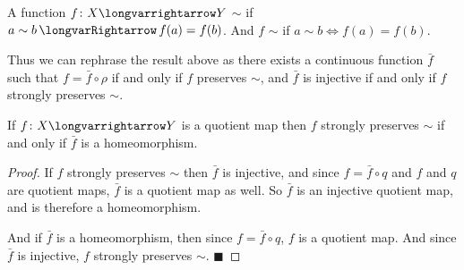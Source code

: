 \documentclass[10pt]{article}
\def\qed{\hskip1cm\penalty-100\hbox{}\hfill$\blacksquare$}
\def\longto{\longvarrightarrow}
\def\implies{\,\longvarRightarrow\,}
\begin{document}
\begin{defn*}

    A function $f\colon X\longto Y$  $\sim$ if $a\sim b\implies f(a)=f(b)$.
    And $f$  $\sim$ if $a\sim b\iff f(a)=f(b)$.

\end{defn*}

Thus we can rephrase the result above as there exists a continuous function $\bar f$ such that $f=\bar f\circ\rho$ if and only if $f$ preserves $\sim$, and $\bar f$ is injective if and only if $f$ strongly
preserves $\sim$.

\begin{prop*}

    If $f\colon X\longto Y$ is a quotient map then $f$ strongly preserves $\sim$ if and only if $\bar f$ is a homeomorphism.

\end{prop*}

\begin{proof}

    If $f$ strongly preserves $\sim$ then $\bar f$ is injective, and since $f=\bar f\circ q$ and $f$ and $q$ are quotient maps, $\bar f$ is a quotient map as well.
    So $\bar f$ is an injective quotient map, and is therefore a homeomorphism.

    And if $\bar f$ is a homeomorphism, then since $f=\bar f\circ q$, $f$ is a quotient map.
    And since $\bar f$ is injective, $f$ strongly preserves $\sim$.
    \qed

\end{proof}
\end{document}
